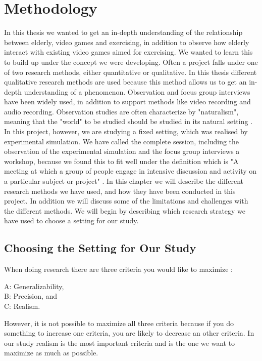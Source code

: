 \chapter{Methodology}
In this thesis we wanted to get an in-depth understanding  of the relationship between elderly, video games and exercising, in addition to observe how elderly interact with existing video games aimed for exercising. We wanted to learn this to build up under the concept we were developing. Often a project falls under one of two research methods, either quantitative or qualitative.  In this thesis  different qualitative research methods are used because this method allows us to get an in-depth understanding of a phenomenon. Observation and focus group interviews have been widely used, in addition to support methods like video recording and audio recording. Observation studies are often characterize by "naturalism", meaning that the "world" to be studied should be studied in its natural setting \cite{tjora}. In this project, however, we are studying a fixed setting, which was realised by experimental simulation.  We have called the complete session, including the observation of the experimental simulation and the focus group interviews a workshop, because we found this to fit well under the definition which is "A meeting at which a group of people engage in intensive discussion and activity on a particular subject or project" \cite{dictionary}. In this chapter we will describe the different research methods we have used, and how they have been conducted in this project. In addition we will discuss some of the limitations and challenges with the different methods. We will begin by describing which research strategy we have used to choose a setting for our study. 

\section{Choosing the Setting for Our Study}
 When doing research there are three criteria you would like to maximize \cite{McGrath}: 
 
A: Generalizability, \\
B: Precision, and \\
C: Realism.  

However, it is not possible  to maximize all three criteria because if you do something to increase one criteria, you are likely to decrease an other criteria. In our study realism is the most important criteria and is the one we want to maximize as much as possible.

